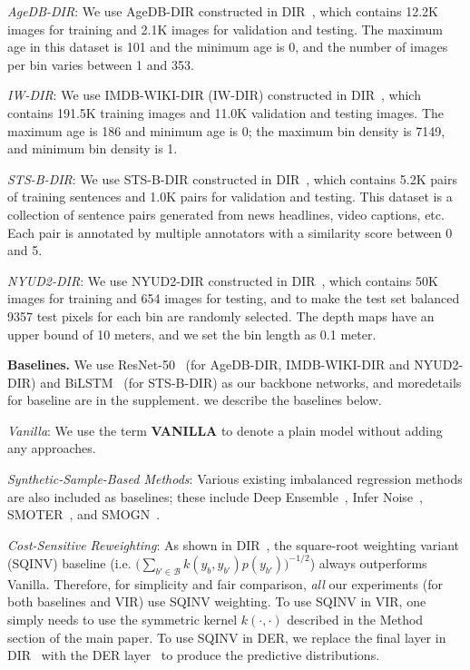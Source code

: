 \begin{compactitem}
\item \emph{AgeDB-DIR}: We use AgeDB-DIR constructed in DIR~\citep{DIR}, which contains 12.2K images for training and 2.1K images for validation and testing. The maximum age in this dataset is 101 and the minimum age is 0, and the number of images per bin varies between 1 and 353.
\item \emph{IW-DIR}: We use IMDB-WIKI-DIR (IW-DIR) constructed in DIR~\citep{DIR}, which contains 191.5K training images and 11.0K validation and testing images. The maximum age is 186 and minimum age is 0; the maximum bin density is 7149, and minimum bin density is 1.
\item {\emph{STS-B-DIR}: We use STS-B-DIR constructed in DIR~\citep{DIR}, which contains 5.2K pairs of training sentences and 1.0K pairs for validation and testing. This dataset is a collection of sentence pairs generated from news headlines, video captions, etc. Each pair is annotated by multiple annotators with a similarity score between 0 and 5.}
\item { {\emph{NYUD2-DIR}}: We use NYUD2-DIR constructed in DIR~\citep{DIR}, which contains 50K images for training and 654 images for testing, and to make the test set balanced 9357 test pixels for each bin are randomly selected. The depth maps have an upper bound of 10 meters, and we set the bin length as 0.1 meter.}
\end{compactitem}

{\textbf{Baselines.} %
We use ResNet-50~\citep{ResNet} (for AgeDB-DIR, IMDB-WIKI-DIR and NYUD2-DIR) and BiLSTM~\citep{bilstm} (for STS-B-DIR) as our backbone networks, and moredetails for baseline are in the supplement. we describe the baselines below.}

\begin{compactitem}
\item \emph{Vanilla}: We use the term \textbf{VANILLA} to denote a plain model without adding any approaches.
\item {\emph{Synthetic-Sample-Based Methods}: Various existing imbalanced regression methods are also included as baselines; these include Deep Ensemble~\citep{DeepEnsemble}, Infer Noise~\citep{TFuncertainty}, SMOTER~\citep{IRrelated1}, and SMOGN~\citep{IRrelated2}.}
\item {\emph{Cost-Sensitive Reweighting}}: As shown in DIR~\citep{DIR}, the square-root weighting variant (SQINV) baseline {(i.e. $\big(\sum_{b' \in \mathcal{B}} k (y_b, y_{b'}) p(y_{b'})\big)^{-1/2}$)} always outperforms Vanilla. {Therefore, for simplicity and fair comparison, \emph{all} our experiments (for both baselines and VIR) use SQINV weighting.} To use SQINV in VIR, one simply needs to use the symmetric kernel $k(\cdot, \cdot)$ described {in the Method section of the main paper.} To use SQINV in DER, we replace the final layer in DIR~\citep{DIR} with the DER layer~\citep{DER} to produce the predictive distributions.
\end{compactitem}

